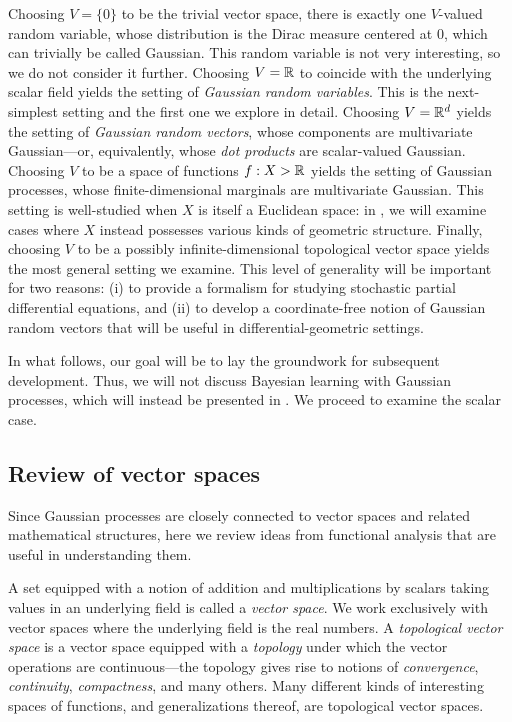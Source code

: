 \documentclass[11pt]{book}
\begin{document}
\1  Choosing $V = \{0\}$ to be the trivial vector space, there is exactly one $V$-valued random variable, whose distribution is the Dirac measure centered at $0$, which can trivially be called Gaussian.
This random variable is not very interesting, so we do not consider it further.
\2 Choosing $V = \mathbb{R}$ to coincide with the underlying scalar field yields the setting of \emph{Gaussian random variables}.
This is the next-simplest setting and the first one we explore in detail.
\3 Choosing $V = \mathbb{R}^d$ yields the setting of \emph{Gaussian random vectors}, whose components are multivariate Gaussian---or, equivalently, whose \emph{dot products} are scalar-valued Gaussian.
\4 Choosing $V$ to be a space of functions $f : X \-> \mathbb{R}$ yields the setting of Gaussian processes, whose finite-dimensional marginals are multivariate Gaussian.
This setting is well-studied when $X$ is itself a Euclidean space: in , we will examine cases where $X$ instead possesses various kinds of geometric structure.
\5 Finally, choosing $V$ to be a possibly infinite-dimensional topological vector space yields the most general setting we examine.
This level of generality will be important for two reasons: (i) to provide a formalism for studying stochastic partial differential equations, and (ii) to develop a coordinate-free notion of Gaussian random vectors that will be useful in differential-geometric settings.
\0 

In what follows, our goal will be to lay the groundwork for subsequent development.
Thus, we will not discuss Bayesian learning with Gaussian processes, which will instead be presented in .
We proceed to examine the scalar case.

\subsection{Review of vector spaces}
Since Gaussian processes are closely connected to vector spaces and related mathematical structures, here we review ideas from functional analysis that are useful in understanding them.

A set equipped with a notion of addition and multiplications by scalars taking values in an underlying field is called a \emph{vector space}.
We work exclusively with vector spaces where the underlying field is the real numbers.
A \emph{topological vector space} is a vector space equipped with a \emph{topology} under which the vector operations are continuous---the topology gives rise to notions of \emph{convergence}, \emph{continuity}, \emph{compactness}, and many others.
Many different kinds of interesting spaces of functions, and generalizations thereof, are topological vector spaces.
\end{document}
